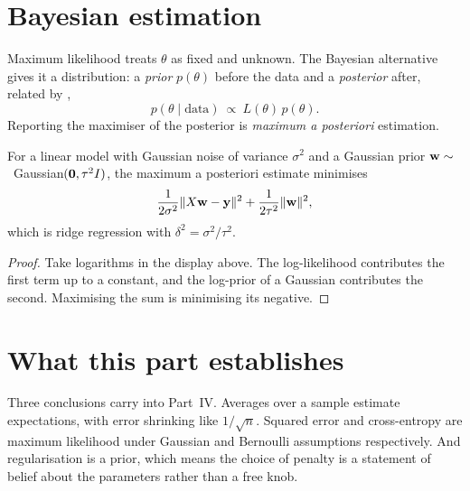 \section{Bayesian estimation}

Maximum likelihood treats \(\theta\) as fixed and unknown. The Bayesian
alternative gives it a distribution: a \emph{prior} \(p(\theta)\) before the data
and a \emph{posterior} after, related by ,
\[
	p(\theta\mid \text{data})\ \propto\ L(\theta)\,p(\theta).
\]
Reporting the maximiser of the posterior is \emph{maximum a posteriori}
estimation.

\begin{proposition}
For a linear model with Gaussian noise of variance \(\sigma^{2}\) and a Gaussian
prior \(\mathbf{w}\sim\)~Gaussian\((\mathbf{0},\tau^{2}I)\), the maximum a posteriori
estimate minimises
\[
	\frac{1}{2\sigma^{2}}\lVert X\mathbf{w}-\mathbf{y}\rVert^{2}
	+\frac{1}{2\tau^{2}}\lVert\mathbf{w}\rVert^{2},
\]
which is ridge regression with \(\delta^{2}=\sigma^{2}/\tau^{2}\).
\end{proposition}

\begin{proof}
Take logarithms in the display above. The log-likelihood contributes the first
term up to a constant, and the log-prior of a Gaussian contributes the second.
Maximising the sum is minimising its negative.
\end{proof}


\section{What this part establishes}

Three conclusions carry into Part~IV. Averages over a sample estimate
expectations, with error shrinking like \(1/\sqrt n\). Squared error and
cross-entropy are maximum likelihood under Gaussian and Bernoulli assumptions
respectively. And regularisation is a prior, which means the choice of penalty is
a statement of belief about the parameters rather than a free knob.
